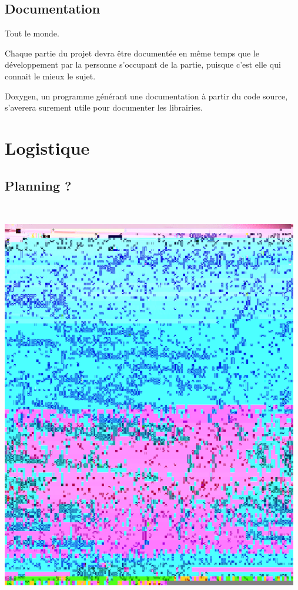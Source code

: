 \documentclass[14pt,a4paper]{article}
\begin{document}
\subsection{Documentation}
Tout le monde.
\\
\par
Chaque partie du projet devra \^etre document\'ee en m\^eme temps que
 le d\'eveloppement par la personne s'occupant de la partie,
 puisque c'est elle qui connait le mieux le sujet.
\\
\par
Doxygen, un programme g\'en\'erant une documentation \`a partir du code source, s'averera surement utile pour documenter les librairies.

\newpage
\section{Logistique}

\subsection{Planning ?}
\rule{0cm}{1cm}\\
\centerline{\includegraphics[width=13cm]{planning.jpg}}
\end{document}

